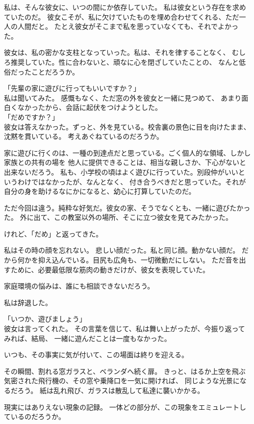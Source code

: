 \documentclass[../IHMain]{subfiles}
\begin{document}
私は、そんな彼女に、いつの間にか依存していた。
私は彼女という存在を求めていたのだ。
彼女こそが、私に欠けていたものを埋め合わせてくれる、ただ一人の人間だと。
たとえ彼女がそこまで私を思っていなくても、それでよかった。

彼女は、私の密かな支柱となっていった。私は、それを律することなく、
むしろ推奨していた。性に合わないと、頑なに心を閉ざしていたことの、
なんと低俗だったことだろうか。

「先輩の家に遊びに行ってもいいですか？」\\
私は聞いてみた。
感慨もなく、ただ窓の外を彼女と一緒に見つめて、
あまり面白くなかったから、会話に起伏をつけようとした。\\
「だめですか？」\\
彼女は答えなかった。ずっと、外を見ている。校舎裏の景色に目を向けたまま、沈黙を貫いている。
考えあぐねているのだろうか。

家に遊びに行くのは、一種の到達点だと思っている。ごく個人的な領域、しかし家族との共有の場を
他人に提供できることは、相当な親しさか、下心がないと出来ないだろう。
私も、小学校の頃はよく遊びに行っていた。別段仲がいいというわけではなかったが、なんとなく、
付き合うべきだと思っていた。それが自分の身を助けるなにかになると、幼心に打算していたのだ。

ただ今回は違う。純粋な好気だ。彼女の家、そうでなくとも、一緒に遊びたかった。
外に出て、この教室以外の場所、そこに立つ彼女を見てみたかった。

けれど、「だめ」と返ってきた。

私はその時の顔を忘れない。
悲しい顔だった。私と同じ顔。動かない顔だ。
だから何かを抑え込んでいる。目尻も広角も、一切微動だにしない。
ただ音を出すために、必要最低限な筋肉の動きだけが、彼女を表現していた。

家庭環境の悩みは、誰にも相談できないだろう。

私は辞退した。

「いつか、遊びましょう」\\
彼女は言ってくれた。
その言葉を信じて、私は舞い上がったが、今振り返ってみれば、結局、
一緒に遊んだことは一度もなかった。

いつも、その事実に気が付いて、この場面は終りを迎える。

その瞬間、割れる窓ガラスと、ベランダへ続く扉。
きっと、はるか上空を飛ぶ気密された飛行機の、その窓や乗降口を一気に開ければ、
同じような光景になるだろう。
紙は乱れ飛び、ガラスは散乱して私達に襲いかかる。

現実にはありえない現象の記録。
一体どの部分が、この現象をエミュレートしているのだろうか。
\end{document}
